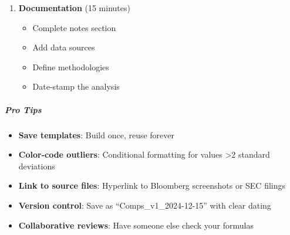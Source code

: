 \documentclass[11pt]{article}
\begin{document}
\begin{enumerate}[leftmargin=*,itemsep=2pt,topsep=2pt]
\begin{itemize}[leftmargin=*,itemsep=2pt,topsep=2pt]
\item {} Run sanity checks
\item {} Verify formula references
\item {} Check for \#DIV/0! or \#REF! errors
\item {} Compare against known benchmarks
\end{itemize}
\item {} \textbf{Documentation} (15 minutes)
\begin{itemize}[leftmargin=*,itemsep=2pt,topsep=2pt]
\item {} Complete notes section
\item {} Add data sources
\item {} Define methodologies
\item {} Date-stamp the analysis
\end{itemize}
\end{enumerate}

\subparagraph{Pro Tips}\mbox{}\par
\begin{itemize}[leftmargin=*,itemsep=2pt,topsep=2pt]
\item {} \textbf{Save templates}: Build once, reuse forever
\item {} \textbf{Color-code outliers}: Conditional formatting for values >2 standard deviations
\item {} \textbf{Link to source files}: Hyperlink to Bloomberg screenshots or SEC filings
\item {} \textbf{Version control}: Save as ``Comps\_\allowbreak{}v1\_\allowbreak{}2024-12-15'' with clear dating
\item {} \textbf{Collaborative reviews}: Have someone else check your formulas
\end{itemize}
\end{document}
